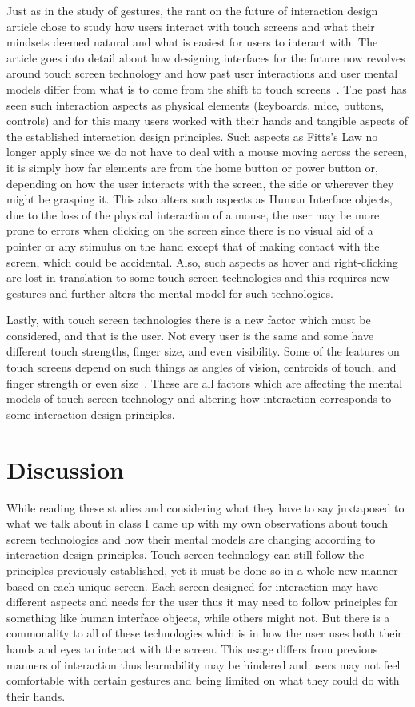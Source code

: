 \documentclass[12pt]{article}
\begin{document}
     Just as in the study of gestures, the rant on the future of interaction design article chose to study how users interact with touch screens and what their mindsets deemed natural and what is easiest for users to interact with. The article goes into detail about how designing interfaces for the future now revolves around touch screen technology and how past user interactions and user mental models differ from what is to come from the shift to touch screens~\cite{Touch}. The past has seen such interaction aspects as physical elements (keyboards, mice, buttons, controls) and for this many users worked with their hands and tangible aspects of the established interaction design principles. Such aspects as Fitts's Law no longer apply since we do not have to deal with a mouse moving across the screen, it is simply how far elements are from the home button or power button or, depending on how the user interacts with the screen, the side or wherever they might be grasping it. This also alters such aspects as Human Interface objects, due to the loss of the physical interaction of a mouse, the user may be more prone to errors when clicking on the screen since there is no visual aid of a pointer or any stimulus on the hand except that of making contact with the screen, which could be accidental. Also, such aspects as hover and right-clicking are lost in translation to some touch screen technologies and this requires new gestures and further alters the mental model for such technologies. 
     
     Lastly, with touch screen technologies there is a new factor which must be considered, and that is the user. Not every user is the same and some have different touch strengths, finger size, and even visibility. Some of the features on touch screens depend on such things as angles of vision, centroids of touch, and finger strength or even size~\cite{Hands}. These are all factors which are affecting the mental models of touch screen technology and altering how interaction corresponds to some interaction design principles. 

\section{Discussion}

     While reading these studies and considering what they have to say juxtaposed to what we talk about in class I came up with my own observations about touch screen technologies and how their mental models are changing according to interaction design principles. Touch screen technology can still follow the principles previously established, yet it must be done so in a whole new manner based on each unique screen. Each screen designed for interaction may have different aspects and needs for the user thus it may need to follow principles for something like human interface objects, while others might not. But there is a commonality to all of these technologies which is in how the user uses both their hands and eyes to interact with the screen. This usage differs from previous manners of interaction thus learnability may be hindered and users may not feel comfortable with certain gestures and being limited on what they could do with their hands.
\end{document}
